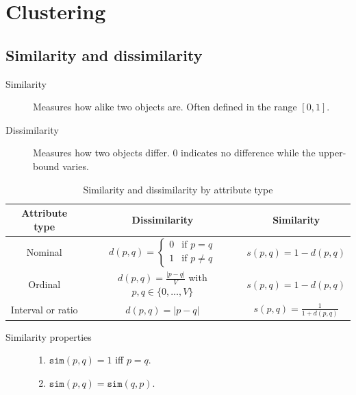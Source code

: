 \chapter{Clustering}


\section{Similarity and dissimilarity}

\begin{description}
    \item[Similarity] 
        Measures how alike two objects are.
        Often defined in the range $[0, 1]$.

    \item[Dissimilarity] 
        Measures how two objects differ.
        0 indicates no difference while the upper-bound varies.
\end{description}

\begin{table}[ht]
    \centering
    \renewcommand{\arraystretch}{2}
    \begin{tabular}{c | c | c}
        \textbf{Attribute type} & \textbf{Dissimilarity} & \textbf{Similarity} \\
        \hline
        Nominal & $d(p, q) = \begin{cases} 0 & \text{if } p=q \\ 1 & \text{if } p \neq q \end{cases}$ & $s(p, q) = 1 - d(p, q)$ \\
        \hline
        Ordinal & $d(p, q) = \frac{\vert p - q \vert}{V}$ with $p, q \in \{ 0, \dots, V \}$ & $s(p, q) = 1 - d(p, q)$ \\
        \hline
        Interval or ratio & $d(p, q) = \vert p - q \vert$ & $s(p, q) = \frac{1}{1 + d(p, q)}$
    \end{tabular}
    \caption{Similarity and dissimilarity by attribute type}
\end{table}

\begin{description}
    \item[Similarity properties] \phantom{}
        \begin{enumerate}
            \item $\texttt{sim}(p, q) = 1$ iff $p = q$. 
            \item $\texttt{sim}(p, q) = \texttt{sim}(q, p)$. 
        \end{enumerate}
\end{description}


